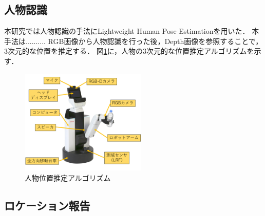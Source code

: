 \documentclass[a4j]{jarticle}
\begin{document}
\subsection{人物認識}
本研究では人物認識の手法にLightweight Human Pose Estimation\cite{light-openpose}を用いた．
本手法は..........
RGB画像から人物認識を行った後，Depth画像を参照することで，3次元的な位置を推定する．
図\ref{human_estimation_explain}に，人物の3次元的な位置推定アルゴリズムを示す．
\begin{figure}[ht]
  \centering
  \includegraphics[width=6cm]{images/hsr/hsr_explain_ja.png}
  \caption{人物位置推定アルゴリズム}
  \label{human_estimation_explain}
\end{figure}

\subsection{ロケーション報告}

\end{document}
